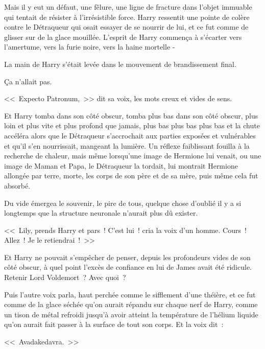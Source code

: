 Mais il y eut un défaut, une fêlure, une ligne de fracture dans l'objet immuable qui tentait de résister à l'irrésistible force. Harry ressentit une pointe de colère contre le Détraqueur qui osait essayer de se nourrir de lui, et ce fut comme de glisser sur de la glace mouillée. L'esprit de Harry commença à s'écarter vers l'amertume, vers la furie noire, vers la haine mortelle -

La main de Harry s'était levée dans le mouvement de brandissement final.

Ça n'allait pas.

<<~Expecto Patronum,~>> dit sa voix, les mots creux et vides de sens.

Et Harry tomba dans son côté obscur, tomba plus bas dans son côté obscur, plus loin et plus vite et plus profond que jamais, plus bas plus bas plus bas et la chute accéléra alors que le Détraqueur s'accrochait aux parties exposées et vulnérables et qu'il s'en nourrissait, mangeant la lumière. Un réflexe faiblissant fouilla à la recherche de chaleur, mais même lorsqu'une image de Hermione lui venait, ou une image de Maman et Papa, le Détraqueur la tordait, lui montrait Hermione allongée par terre, morte, les corps de son père et de sa mère, puis même cela fut absorbé.

Du vide émergea le souvenir, le pire de tous, quelque chose d'oublié il y a si longtemps que la structure neuronale n'aurait plus dû exister.
\begin{em}
<<~Lily, prends Harry et pars~! C'est lui~! cria la voix d'un homme. Cours~! Allez~! Je le retiendrai~!~>>

Et Harry ne pouvait s'empêcher de penser, depuis les profondeurs vides de son côté obscur, à quel point l'excès de confiance en lui de James avait été ridicule. Retenir Lord Voldemort~? Avec quoi~?

Puis l'autre voix parla, haut perchée comme le sifflement d'une théière, et ce fut comme de la glace séchée qu'on aurait répandu sur chaque nerf de Harry, comme un tison de métal refroidi jusqu'à avoir atteint la température de l'hélium liquide qu'on aurait fait passer à la surface de tout son corps. Et la voix dit~:

<<~Avadakedavra.~>>
\end{em}

